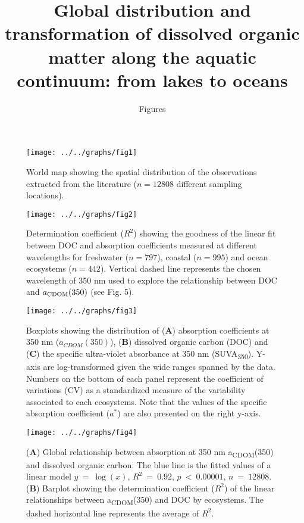 \documentclass[12pt,a4paper]{scrartcl}
\title{Global distribution and transformation of dissolved organic matter along the aquatic continuum: from lakes to oceans}
\subtitle{Figures}
\date{}
\begin{document}

\begin{figure}[h]
	\centering
	\texttt{[image: ../../graphs/fig1]}
	\caption{World map showing the spatial distribution of the observations extracted from the literature ($n = 12808$ different sampling locations).}
\end{figure}

\clearpage
\newpage

\begin{figure}[h]
	\centering
	\texttt{[image: ../../graphs/fig2]}
	\caption{Determination coefficient ($R^2$) showing the goodness of the linear fit between DOC and absorption coefficients measured at different wavelengths for freshwater ($n = 797$), coastal ($n = 995$) and ocean ecosystems ($n = 442$). Vertical dashed line represents the chosen wavelength of 350 nm used to explore the relationship between DOC and $a\textsubscript{CDOM}(350)$ (see Fig. 5).}
\end{figure}

\clearpage
\newpage

\begin{figure}[h]
	\centering
	\texttt{[image: ../../graphs/fig3]}
	\caption{Boxplots showing the distribution of (\textbf{A}) absorption coefficients at 350 nm ($a_{CDOM}(350)$), (\textbf{B}) dissolved organic carbon (DOC) and (\textbf{C}) the specific ultra-violet absorbance at 350 nm (SUVA\textsubscript{350}). Y-axis are log-transformed given the wide ranges spanned by the data. Numbers on the bottom of each panel represent the coefficient of variations (CV) as a standardized measure of the variability associated to each ecosystems. Note that the values of the specific absorption coefficient ($a^*$) are also presented on the right y-axis.}
\end{figure}

\clearpage
\newpage

\begin{figure}[h]
	\centering
	\texttt{[image: ../../graphs/fig4]}
	\caption{(\textbf{A}) Global relationship between absorption at 350 nm a\textsubscript{CDOM}(350) and dissolved organic carbon. The blue line is the fitted values of a linear model $y~=~\log(x)$, $R^2~=~0.92$, $p~<~0.00001$, $n~=~12808$. (\textbf{B}) Barplot showing the determination coefficient ($R^2$) of the linear relationships between a\textsubscript{CDOM}(350) and DOC by ecosystems. The dashed horizontal line represents the average of $R^2$.}
\end{figure}
\end{document}
